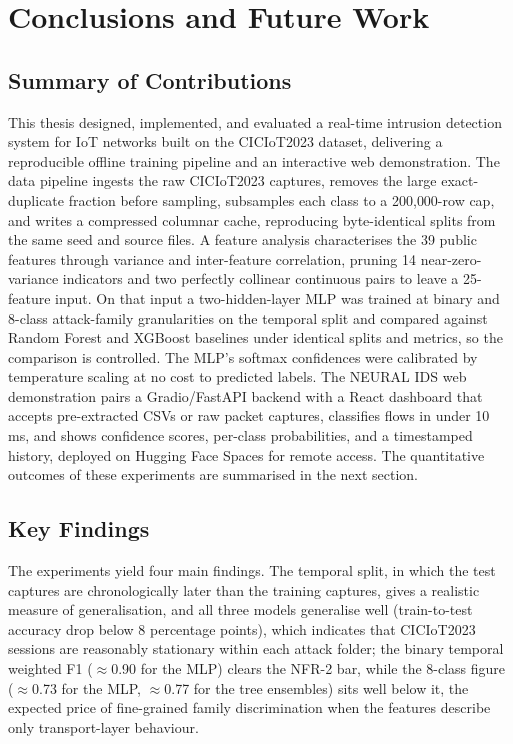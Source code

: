 \chapter{Conclusions and Future Work}
\label{chap:conclusions}

\section{Summary of Contributions}
\label{sec:contributions}

\par This thesis designed, implemented, and evaluated a real-time intrusion detection system for IoT networks built on the CICIoT2023 dataset, delivering a reproducible offline training pipeline and an interactive web demonstration. The data pipeline ingests the raw CICIoT2023 captures, removes the large exact-duplicate fraction before sampling, subsamples each class to a 200{,}000-row cap, and writes a compressed columnar cache, reproducing byte-identical splits from the same seed and source files. A feature analysis characterises the 39 public features through variance and inter-feature correlation, pruning 14 near-zero-variance indicators and two perfectly collinear continuous pairs to leave a 25-feature input. On that input a two-hidden-layer MLP was trained at binary and 8-class attack-family granularities on the temporal split and compared against Random Forest and XGBoost baselines under identical splits and metrics, so the comparison is controlled. The MLP's softmax confidences were calibrated by temperature scaling at no cost to predicted labels. The NEURAL IDS web demonstration pairs a Gradio/FastAPI backend with a React dashboard that accepts pre-extracted CSVs or raw packet captures, classifies flows in under 10 ms, and shows confidence scores, per-class probabilities, and a timestamped history, deployed on Hugging Face Spaces for remote access. The quantitative outcomes of these experiments are summarised in the next section.

\section{Key Findings}
\label{sec:key_findings}

\par The experiments yield four main findings. The temporal split, in which the test captures are chronologically later than the training captures, gives a realistic measure of generalisation, and all three models generalise well (train-to-test accuracy drop below 8 percentage points), which indicates that CICIoT2023 sessions are reasonably stationary within each attack folder; the binary temporal weighted F1 ($\approx$0.90 for the MLP) clears the NFR-2 bar, while the 8-class figure ($\approx$0.73 for the MLP, $\approx$0.77 for the tree ensembles) sits well below it, the expected price of fine-grained family discrimination when the features describe only transport-layer behaviour.


